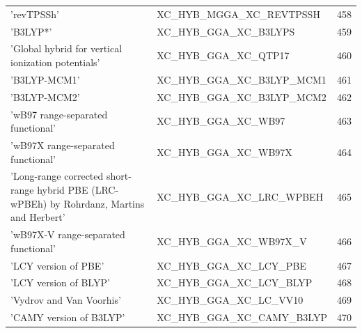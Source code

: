 \documentclass[final,12pt]{article}
\begin{document}
{{{{{{\begin{table}[!h]
\begin{center}
\begin{tabular}{llr}
  'revTPSSh' & XC\_HYB\_MGGA\_XC\_REVTPSSH  &458\\
  'B3LYP*' & XC\_HYB\_GGA\_XC\_B3LYPS  &459\\
  'Global hybrid for vertical ionization potentials' & XC\_HYB\_GGA\_XC\_QTP17  &460\\
  'B3LYP-MCM1' & XC\_HYB\_GGA\_XC\_B3LYP\_MCM1  &461\\
  'B3LYP-MCM2' & XC\_HYB\_GGA\_XC\_B3LYP\_MCM2  &462\\
  'wB97 range-separated functional' & XC\_HYB\_GGA\_XC\_WB97  &463\\
  'wB97X range-separated functional' & XC\_HYB\_GGA\_XC\_WB97X  &464\\
  'Long-range corrected short-range hybrid PBE (LRC-wPBEh) by Rohrdanz, Martins and Herbert' & XC\_HYB\_GGA\_XC\_LRC\_WPBEH  &465\\
  'wB97X-V range-separated functional' & XC\_HYB\_GGA\_XC\_WB97X\_V  &466\\
  'LCY version of PBE' & XC\_HYB\_GGA\_XC\_LCY\_PBE  &467\\
  'LCY version of BLYP' & XC\_HYB\_GGA\_XC\_LCY\_BLYP  &468\\
  'Vydrov and Van Voorhis' & XC\_HYB\_GGA\_XC\_LC\_VV10  &469\\
  'CAMY version of B3LYP' & XC\_HYB\_GGA\_XC\_CAMY\_B3LYP  &470\\
\end{tabular}
\end{center}
\end{table}

}}}}}}
\end{document}
